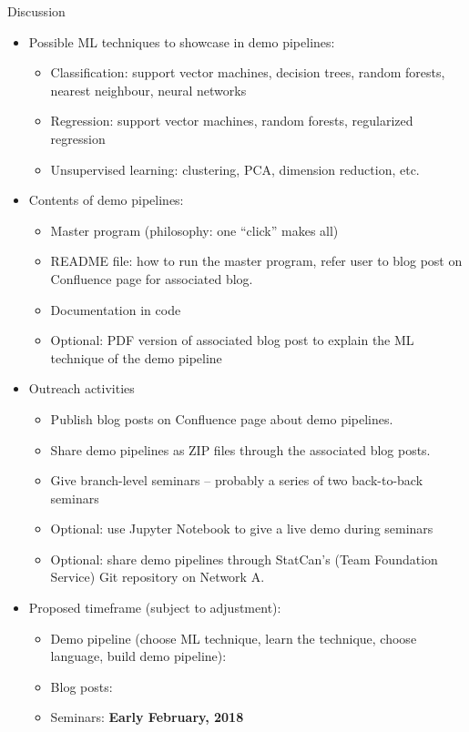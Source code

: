 

\begin{frame}{\vskip -0.2cm \normalsize Discussion}

\vskip -0.2cm
\begin{itemize}\scriptsize
\item
	Possible ML techniques to showcase in demo pipelines:
	\begin{itemize}\tiny
	\item
		Classification: support vector machines, decision trees, random forests, nearest neighbour, neural networks
	\item
		Regression: support vector machines, random forests, regularized regression
	\item
		Unsupervised learning: clustering, PCA, dimension reduction, etc.
	\end{itemize}

\item
	Contents of demo pipelines:
	\begin{itemize}\tiny
	\item
		Master program (philosophy: one ``click'' makes all)
	\item
		README file: how to run the master program, refer user to blog post on Confluence page for associated blog.
	\item
		Documentation in code
	\item
		Optional: PDF version of associated blog post to explain the ML technique of the demo pipeline
	\end{itemize}

\item
	Outreach activities
	\begin{itemize}\tiny
	\item
		Publish blog posts on Confluence page about demo pipelines.
	\item
		Share demo pipelines as ZIP files through the associated blog posts.
	\item
		Give branch-level seminars -- probably a series of two back-to-back seminars
	\item
		Optional: use {\color{red}Jupyter} Notebook to give a live demo during seminars
	\item
		Optional: share demo pipelines through StatCan's (Team Foundation Service) Git repository on Network A.
	\end{itemize}

\item
	Proposed timeframe (subject to adjustment):
	\begin{itemize}\tiny
	\item
		Demo pipeline (choose ML technique, learn the technique, choose language, build demo pipeline):
	\item
		Blog posts:
	\item
		Seminars: \textbf{\color{red}Early February, 2018}
	\end{itemize}


\end{itemize}
\end{frame}
